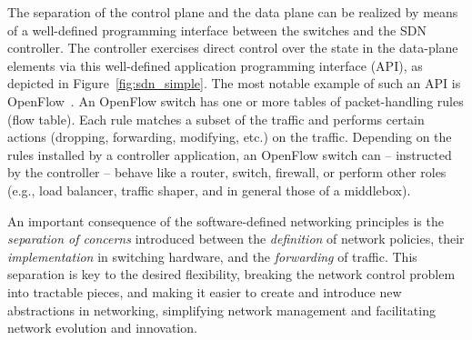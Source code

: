 The separation of the control plane and the data plane can be realized
by means of a well-defined programming interface between the switches
and the SDN controller.  The controller exercises direct control over
the state in the data-plane elements via this well-defined application programming interface (API), as
depicted in Figure~\ref{fig:sdn_simple}.  The most notable example of
such an API is OpenFlow~\cite{mckeown2008, onf2013-3}.  An OpenFlow
switch has one or more tables of packet-handling rules (flow table).  
Each rule matches a subset of the traffic and performs certain actions (dropping,
forwarding, modifying, etc.) on the traffic.
Depending on the rules installed by a controller application, an
OpenFlow switch can -- instructed by the controller -- behave like a
router, switch, firewall, or perform other roles (e.g., load balancer, traffic shaper, and in general those of a
middlebox).

An important consequence of the software-defined networking principles
is the \textit{separation of concerns} introduced between the
\textit{definition} of network policies, their \textit{implementation}
in switching hardware, and the \textit{forwarding} of traffic. This separation is key to the
desired flexibility, breaking the network control problem into
tractable pieces, and making it easier to create and introduce new
abstractions in networking, simplifying network management and
facilitating network evolution and innovation.

